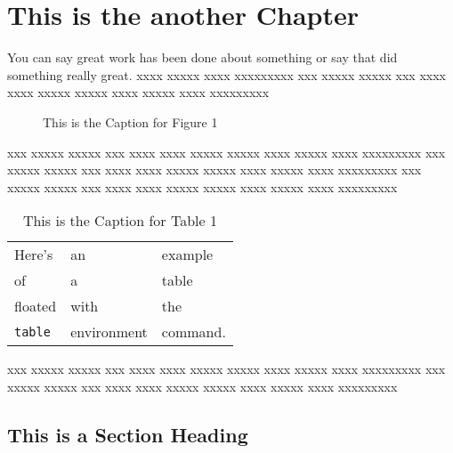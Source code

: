  
\chapter{This is the another Chapter}
 
You can say great work has been done about something \citep{Castleman98,Granlund95} or say that \citet{Holmes95} did something really great.
xxxx xxxxx xxxx xxxxxxxxx 
xxx xxxxx xxxxx xxx xxxx xxxx xxxxx xxxxx xxxx xxxxx xxxx xxxxxxxxx
 
\begin{figure}
\vspace{2.0in}
\caption{This is the Caption for Figure 1}
\end{figure}
 
xxx xxxxx xxxxx xxx xxxx xxxx xxxxx xxxxx xxxx xxxxx xxxx xxxxxxxxx
xxx xxxxx xxxxx xxx xxxx xxxx xxxxx xxxxx xxxx xxxxx xxxx xxxxxxxxx
xxx xxxxx xxxxx xxx xxxx xxxx xxxxx xxxxx xxxx xxxxx xxxx xxxxxxxxx
 
\begin{table}[tp]
\begin{center}
\begin{tabular}{lll}
Here's       & an          & example  \\
of           & a           & table    \\
floated      & with        & the      \\
\verb+table+ & environment & command.
\end{tabular}
\end{center}
\caption{This is the Caption for Table 1}
\end{table}
 
xxx xxxxx xxxxx xxx xxxx xxxx xxxxx xxxxx xxxx xxxxx xxxx xxxxxxxxx
xxx xxxxx xxxxx xxx xxxx xxxx xxxxx xxxxx xxxx xxxxx xxxx xxxxxxxxx
 
\section{This is a Section Heading}
 